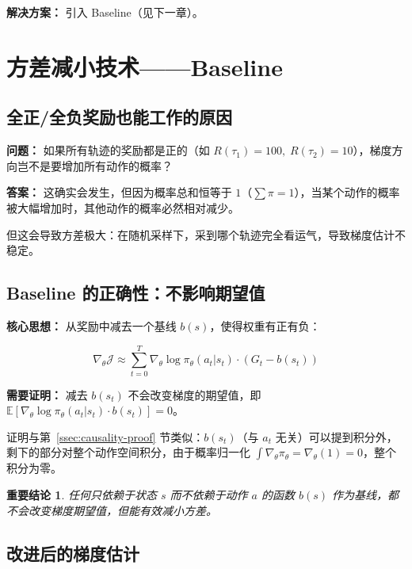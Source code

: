 \documentclass[12pt,a4paper]{article}
\newcommand{\E}{\mathbb{E}}
\newcommand{\grad}{\nabla}
\theoremstyle{noteplain}
\newtheorem{important}{重要结论}[section]
\theoremstyle{noteexercise}
\begin{document}
\textbf{解决方案：} 引入 Baseline（见下一章）。

\section{方差减小技术——Baseline}\label{sec:baseline}

\subsection{全正/全负奖励也能工作的原因}\label{ssec:all-positive}

\textbf{问题：} 如果所有轨迹的奖励都是正的（如 $R(\tau_1) = 100,\; R(\tau_2) = 10$），梯度方向岂不是要增加所有动作的概率？

\textbf{答案：} 这确实会发生，但因为概率总和恒等于 $1$（$\sum \pi = 1$），当某个动作的概率被大幅增加时，其他动作的概率必然相对减少。

但这会导致方差极大：在随机采样下，采到哪个轨迹完全看运气，导致梯度估计不稳定。

\subsection{Baseline 的正确性：不影响期望值}\label{ssec:baseline-proof}

\textbf{核心思想：} 从奖励中减去一个基线 $b(s)$，使得权重有正有负：

\begin{equation}\label{eq:grad-with-baseline}
  \grad_\theta \mathcal{J} \approx \sum_{t=0}^{T} \grad_\theta \log \pi_\theta(a_t|s_t) \cdot (G_t - b(s_t))
\end{equation}

\textbf{需要证明：} 减去 $b(s_t)$ 不会改变梯度的期望值，即 $\E[\grad_\theta \log \pi_\theta(a_t|s_t) \cdot b(s_t)] = 0$。

证明与第~\ref{ssec:causality-proof} 节类似：$b(s_t)$（与 $a_t$ 无关）可以提到积分外，剩下的部分对整个动作空间积分，由于概率归一化 $\int \grad_\theta \pi_\theta = \grad_\theta(1) = 0$，整个积分为零。

\begin{important}
  任何只依赖于状态 $s$ 而不依赖于动作 $a$ 的函数 $b(s)$ 作为基线，都不会改变梯度期望值，但能有效减小方差。
\end{important}

\subsection{改进后的梯度估计}\label{ssec:baseline-est}
\end{document}
